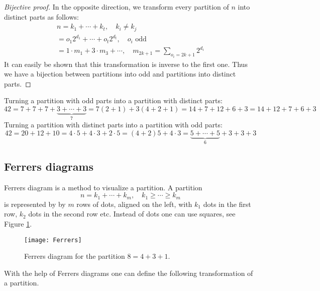 \begin{page}
\begin{proof}[Bijective proof]
In the opposite direction, we transform every partition of $n$ into distinct parts as follows:
\begin{multline*}
n = k_1 + \cdots + k_t, \quad k_i \ne k_j\\
= o_1 2^{d_1} + \cdots + o_t 2^{d_t}, \quad o_i \text{ odd}\\
= 1 \cdot m_1 + 3 \cdot m_3 + \cdots, \quad m_{2k+1} = \sum_{o_i = 2k+1} 2^{d_i}
\end{multline*}
It can easily be shown that this transformation is inverse to the first one.
Thus we have a bijection between partitions into odd and partitions into distinct parts.
\end{proof}


\end{page}

\begin{page}
\setcounter{section}{3}
\setcounter{subsection}{5}
\setcounter{dfn}{12}
\label{portion:819}

\begin{exl}
Turning a partition with odd parts into a partition with distinct parts:
\[
42 = 7+7+7+\underbrace{3+ \cdots +3}_{7} = 7 (2+1) + 3(4+2+1) = 14 + 7 + 12 + 6 + 3 = 14 + 12 + 7 + 6 + 3
\]
Turning a partition with distinct parts into a partition with odd parts:
\[
42 = 20 + 12 + 10 = 4\cdot 5 + 4 \cdot 3 + 2 \cdot 5 = (4+2)5 + 4\cdot 3 = \underbrace{5+\cdots+5}_{6} + 3 + 3 + 3
\]
\end{exl}

\end{page}

\begin{page}
\setcounter{section}{3}
\setcounter{subsection}{6}
\setcounter{dfn}{12}
\label{portion:821}

\subsection{Ferrers diagrams}
Ferrers diagram is a method to visualize a partition.
A partition
\[
n = k_1 + \cdots + k_m, \quad k_1 \ge \cdots \ge k_m
\]
is represented by by $m$ rows of dots, aligned on the left, with $k_1$ dots in the first row, $k_2$ dots in the second row etc.
Instead of dots one can use squares, see Figure \ref{fig:Ferrers}.

\begin{figure}[ht]
\begin{center}
\texttt{[image: Ferrers]}
\end{center}
\caption{Ferrers diagram for the partition $8 = 4 + 3 + 1$.}
\label{fig:Ferrers}
\end{figure}

With the help of Ferrers diagrams one can define the following transformation of a partition.


\end{page}

